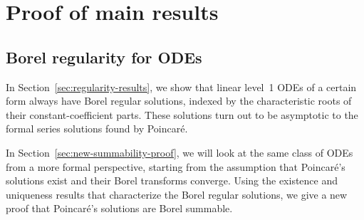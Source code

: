 \documentclass{article}
\theoremstyle{definition}
\theoremstyle{plain}
\begin{document}
\section{Proof of main results}\label{sec:proof_main_results}
%
\subsection{Borel regularity for ODEs}\label{borel_reg-ODE}
In Section~\ref{sec:regularity-results}, we show that linear level~1 ODEs of a certain form always have Borel regular solutions, indexed by the characteristic roots of their constant-coefficient parts. These solutions turn out to be asymptotic to the formal series solutions found by Poincar\'{e}.

In Section~\ref{sec:new-summability-proof}, we will look at the same class of ODEs from a more formal perspective, starting from the assumption that Poincar\'{e}'s solutions exist and their Borel transforms converge. Using the existence and uniqueness results that characterize the Borel regular solutions, we give a new proof that Poincar\'{e}'s solutions are Borel summable.
%
\end{document}
